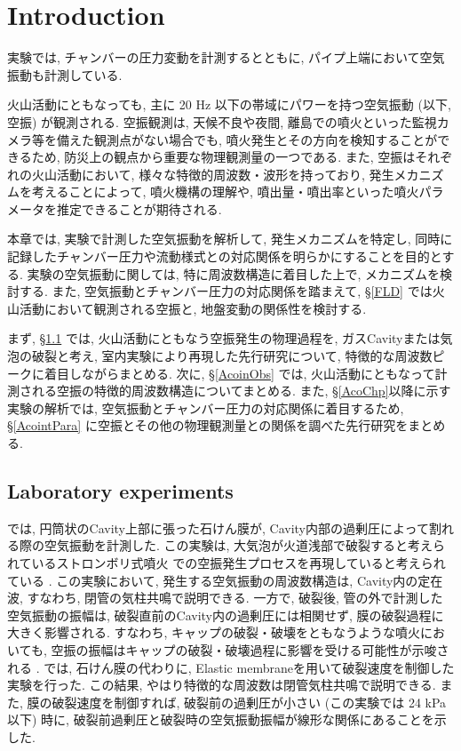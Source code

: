 \documentclass[12pt]{article}
\begin{document}
\newpage
\cleardoublepage


\section{Introduction}\label{ACOintro}
実験では, チャンバーの圧力変動を計測するとともに, パイプ上端において空気振動も計測している. 

火山活動にともなっても, 主に 20 Hz 以下の帯域にパワーを持つ空気振動 (以下, 空振) が観測される. 
空振観測は, 天候不良や夜間, 離島での噴火といった監視カメラ等を備えた観測点がない場合でも, 噴火発生とその方向を検知することができるため, 防災上の観点から重要な物理観測量の一つである.
また, 空振はそれぞれの火山活動において, 様々な特徴的周波数・波形を持っており, 発生メカニズムを考えることによって, 噴火機構の理解や, 噴出量・噴出率といった噴火パラメータを推定できることが期待される. 

本章では, 実験で計測した空気振動を解析して, 発生メカニズムを特定し, 同時に記録したチャンバー圧力や流動様式との対応関係を明らかにすることを目的とする. 実験の空気振動に関しては, 特に周波数構造に着目した上で, メカニズムを検討する. また, 空気振動とチャンバー圧力の対応関係を踏まえて, \S \ref{FLD} では火山活動において観測される空振と, 地盤変動の関係性を検討する.

まず, \S \ref{AcoinEx} では, 火山活動にともなう空振発生の物理過程を, ガスCavityまたは気泡の破裂と考え, 室内実験により再現した先行研究について, 特徴的な周波数ピークに着目しながらまとめる. 次に, \S \ref{AcoinObs} では, 火山活動にともなって計測される空振の特徴的周波数構造についてまとめる. また, \S \ref{AcoChp}以降に示す実験の解析では, 空気振動とチャンバー圧力の対応関係に着目するため, \S \ref{AcointPara} に空振とその他の物理観測量との関係を調べた先行研究をまとめる.


\subsection{Laboratory experiments}\label{AcoinEx}
\cite{Vidal2006a}では, 円筒状のCavity上部に張った石けん膜が, Cavity内部の過剰圧によって割れる際の空気振動を計測した. 
この実験は, 大気泡が火道浅部で破裂すると考えられているストロンボリ式噴火 \citep{Chouet1974, BLACKBURN1976, Vergniolle1996c}での空振発生プロセスを再現していると考えられている \citep{Vidal2010a, Gerst2013a}. 
この実験において, 発生する空気振動の周波数構造は, Cavity内の定在波, すなわち, 閉管の気柱共鳴で説明できる. 一方で, 破裂後, 管の外で計測した空気振動の振幅は, 破裂直前のCavity内の過剰圧には相関せず, 膜の破裂過程に大きく影響される. すなわち, キャップの破裂・破壊をともなうような噴火においても, 空振の振幅はキャップの破裂・破壊過程に影響を受ける可能性が示唆される \citep{Vidal2010a}. \cite{Sanchez2014}では, 石けん膜の代わりに, Elastic membraneを用いて破裂速度を制御した実験を行った. この結果, やはり特徴的な周波数は閉管気柱共鳴で説明できる. また, 膜の破裂速度を制御すれば, 破裂前の過剰圧が小さい (この実験では 24 kPa以下) 時に, 破裂前過剰圧と破裂時の空気振動振幅が線形な関係にあることを示した. 
\end{document}

